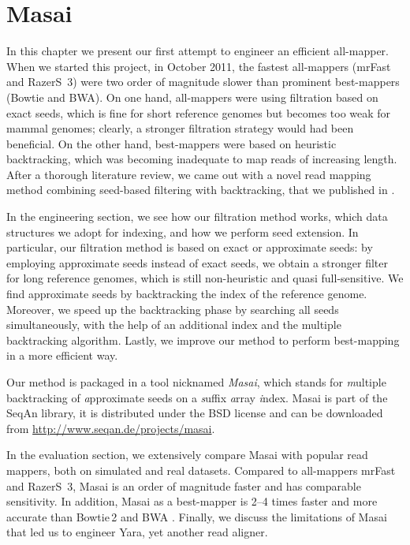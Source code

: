 
\chapter{Masai}

In this chapter we present our first attempt to engineer an efficient all-mapper.
When we started this project, in October 2011, the fastest all-mappers (mrFast and RazerS~3) were two order of magnitude slower than prominent best-mappers (Bowtie and BWA).
On one hand, all-mappers were using filtration based on exact seeds, which is fine for short reference genomes but becomes too weak for mammal genomes; clearly, a stronger filtration strategy would had been beneficial.
On the other hand, best-mappers were based on heuristic backtracking, which was becoming inadequate to map reads of increasing length.
After a thorough literature review, we came out with a novel read mapping method combining seed-based filtering with backtracking, that we published in \citep{Siragusa2013}.

In the engineering section, we see how our filtration method works, which data structures we adopt for indexing, and how we perform seed extension.
In particular, our filtration method is based on exact or approximate seeds: by employing approximate seeds instead of exact seeds, we obtain a stronger filter for long reference genomes, which is still non-heuristic and quasi full-sensitive.
We find approximate seeds by backtracking the index of the reference genome.
Moreover, we speed up the backtracking phase by searching all seeds simultaneously, with the help of an additional index and the multiple backtracking algorithm.
Lastly, we improve our method to perform best-mapping in a more efficient way.

Our method is packaged in a \CC tool nicknamed \emph{Masai}, which stands for \emph{m}ultiple backtracking of \emph{a}pproximate seeds on a \emph{s}uffix \emph{a}rray \emph{i}ndex.
Masai is part of the SeqAn library, it is distributed under the BSD license and can be downloaded from \url{http://www.seqan.de/projects/masai}.

In the evaluation section, we extensively compare Masai with popular read mappers, both on simulated and real datasets.
Compared to all-mappers mrFast and RazerS~3, Masai is an order of magnitude faster and has comparable sensitivity.
In addition, Masai as a best-mapper is 2--4 times faster and more accurate than Bowtie\,2 \citep{Bowtie2} and BWA \citep{BWA}.
Finally, we discuss the limitations of Masai that led us to engineer Yara, yet another read aligner.

